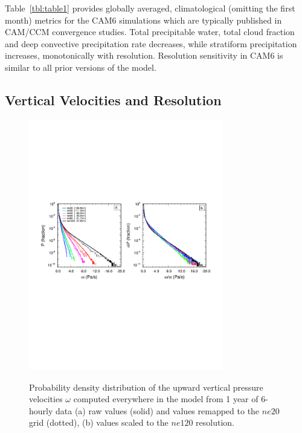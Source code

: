 \documentclass[times]{qjrms4}
\begin{document}
Table~\ref{tbl:table1} provides globally averaged, climatological (omitting the first month) metrics for the CAM6 simulations which are typically published in CAM/CCM convergence studies. Total precipitable water, total cloud fraction and deep convective precipitation rate decreases, while stratiform precipitation increases, monotonically with resolution. Resolution sensitivity in CAM6 is similar to all prior versions of the model. 

\subsection{Vertical Velocities and Resolution}

\begin{figure}[t]
\begin{center}
\noindent\includegraphics[width=20pc,angle=0]{figs/temp_2pdf.pdf}\\
\end{center}
\caption{Probability density distribution of the upward vertical pressure velocities $\omega$ computed everywhere in the model from 1 year of 6-hourly data (a) raw values (solid) and values remapped to the $ne20$ grid (dotted), (b) values scaled to the $ne120$ resolution.}
\label{fig:2pdf}
\end{figure}
\end{document}
